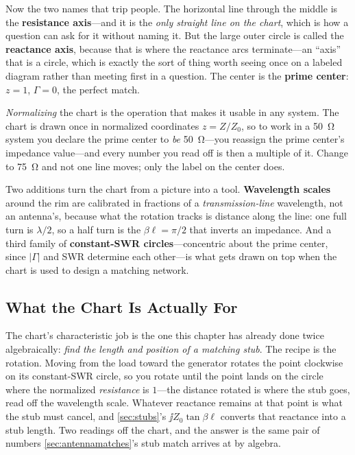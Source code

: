 Now the two names that trip people. The horizontal line through the middle is the
\textbf{resistance axis}---and it is the \emph{only straight line on the chart}, which
is how a question can ask for it without naming it. But the large outer circle is
called the \textbf{reactance axis}, because that is where the reactance arcs
terminate---an ``axis'' that is a circle, which is exactly the sort of thing worth
seeing once on a labeled diagram rather than meeting first in a question. The center
is the \textbf{prime center}: \(z=1\), \(\Gamma=0\), the perfect match.

\emph{Normalizing} the chart is the operation that makes it usable in any system. The
chart is drawn once in normalized coordinates \(z=Z/Z_0\), so to work in a
\SI{50}{\ohm} system you declare the prime center to \emph{be} \SI{50}{\ohm}---you
reassign the prime center's impedance value---and every number you read off is then a
multiple of it. Change to \SI{75}{\ohm} and not one line moves; only the label on the
center does.

Two additions turn the chart from a picture into a tool. \textbf{Wavelength scales}
around the rim are calibrated in fractions of a \emph{transmission-line} wavelength,
not an antenna's, because what the rotation tracks is distance along the line: one full
turn is \(\lambda/2\), so a half turn is the \(\beta\ell=\pi/2\) that inverts an
impedance. And a third family of \textbf{constant-SWR circles}---concentric about the
prime center, since \(|\Gamma|\) and SWR determine each other---is what gets drawn on
top when the chart is used to design a matching network.

\subsection{What the Chart Is Actually For}
\label{sec:smithuse}
The chart's characteristic job is the one this chapter has already done twice
algebraically: \emph{find the length and position of a matching stub}. The recipe is
the rotation. Moving from the load toward the generator rotates the point clockwise on
its constant-SWR circle, so you rotate until the point lands on the circle where the
normalized \emph{resistance} is \(1\)---the distance rotated is where the stub goes,
read off the wavelength scale. Whatever reactance remains at that point is what the
stub must cancel, and \cref{sec:stubs}'s \(\jj Z_0\tan\beta\ell\) converts that
reactance into a stub length. Two readings off the chart, and the answer is the same
pair of numbers \cref{sec:antennamatches}'s stub match arrives at by algebra.

